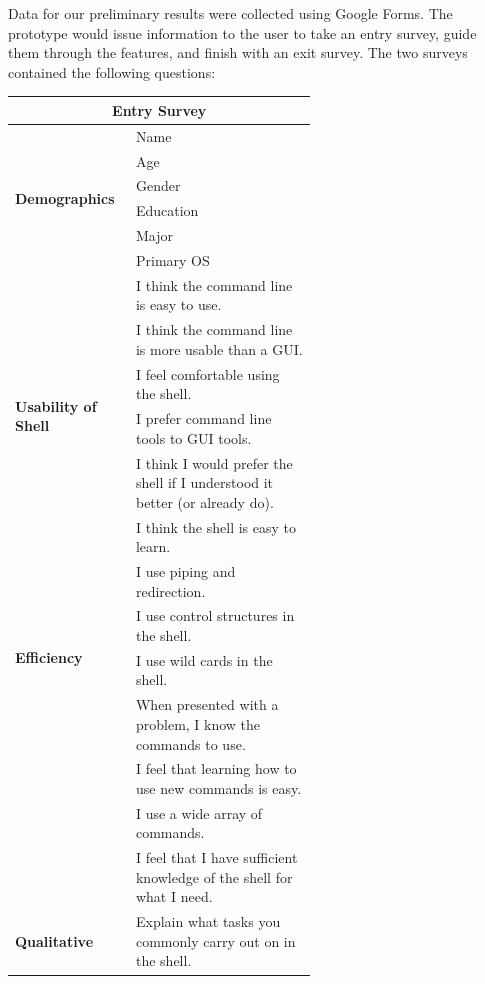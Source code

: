 Data for our preliminary results were collected using Google Forms. The
prototype would issue information to the user to take an entry survey, guide
them through the features, and finish with an exit survey. The two surveys
contained the following questions:

\begin{center}
  \begin{tabular}{|l|p{0.6\linewidth}|}
    \hline
    \multicolumn{2}{|c|}{\Large \textbf{Entry Survey}}\\
    \hline
    \multirow{6}{*}{\textbf{Demographics}}
 & Name \\ \cline{2-2}
 & Age \\\cline{2-2}
 & Gender \\\cline{2-2}
 & Education \\\cline{2-2}
 & Major \\\cline{2-2}
 & Primary OS \\
    \hline
    \multirow{6}{*}{\textbf{Usability of Shell}}
 & I think the command line is easy to use. \\ \cline{2-2}
 & I think the command line is more usable than a GUI. \\ \cline{2-2}
 & I feel comfortable using the shell. \\ \cline{2-2}
 & I prefer command line tools to GUI tools.\\ \cline{2-2}
 & I think I would prefer the shell if I understood it better (or already
   do).\\ \cline{2-2}
 & I think the shell is easy to learn.\\
    \hline
    \multirow{4}{*}{\textbf{Efficiency}}
 & I use piping and redirection. \\ \cline{2-2}
 & I use control structures in the shell.\\ \cline{2-2}
 & I use wild cards in the shell.\\
    \hline
    \multirow{5}{*}{\textbf{Knowledge}}
 & When presented with a problem, I know the commands to use. \\ \cline{2-2}
 & I feel that learning how to use new commands is easy. \\ \cline{2-2}
 & I use a wide array of commands. \\ \cline{2-2}
 & I feel that I have sufficient knowledge of the shell for what I need. \\
    \hline
    \multirow{1}{*}{\textbf{Qualitative}} & Explain what tasks you commonly carry
                                            out on in the shell.\\
    \hline
  \end{tabular}
\end{center}

